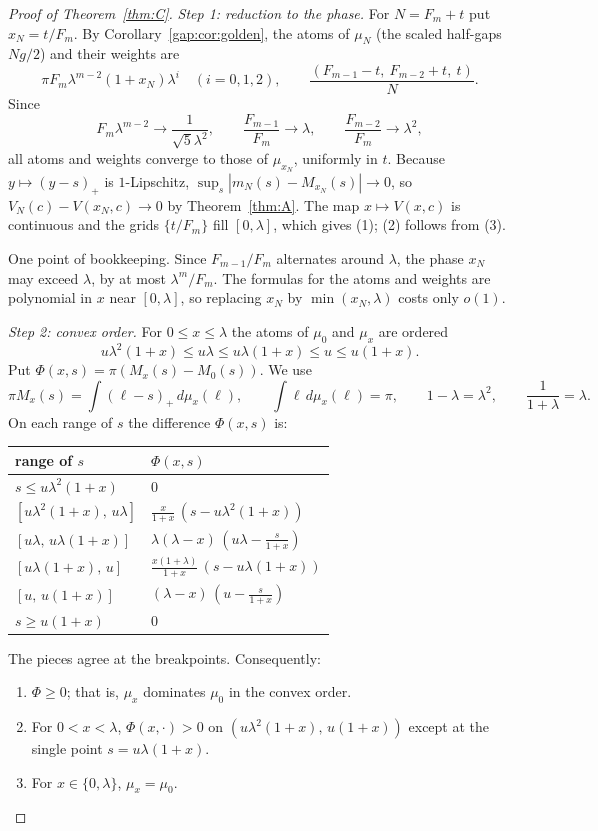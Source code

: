 \documentclass[11pt]{amsart}
\theoremstyle{remark}
\begin{document}
\begin{proof}[Proof of Theorem~\ref{thm:C}]
\emph{Step 1: reduction to the phase.} For $N=F_m+t$ put $x_N=t/F_m$. By
Corollary~\ref{gap:cor:golden}, the atoms of $\mu_N$ (the scaled half-gaps $Ng/2$) and their weights are
\[
\pi F_m\lambda^{m-2}(1+x_N)\lambda^i\quad(i=0,1,2),\qquad
\frac{(F_{m-1}-t,\ F_{m-2}+t,\ t)}{N}.
\]
Since
\[
F_m\lambda^{m-2}\to\frac1{\sqrt5\lambda^2},\qquad
\frac{F_{m-1}}{F_m}\to\lambda,\qquad
\frac{F_{m-2}}{F_m}\to\lambda^2,
\]
all atoms and weights converge to those of $\mu_{x_N}$, uniformly in $t$. Because
$y\mapsto(y-s)_+$ is $1$-Lipschitz, $\sup_s|m_N(s)-M_{x_N}(s)|\to0$, so
$V_N(c)-V(x_N,c)\to0$ by Theorem~\ref{thm:A}. The map $x\mapsto V(x,c)$ is continuous and
the grids $\{t/F_m\}$ fill $[0,\lambda]$, which gives (1); (2) follows from (3).

One point of bookkeeping. Since $F_{m-1}/F_m$ alternates around $\lambda$, the phase $x_N$
may exceed $\lambda$, by at most $\lambda^m/F_m$. The formulas for the atoms and weights
are polynomial in $x$ near $[0,\lambda]$, so replacing $x_N$ by $\min(x_N,\lambda)$ costs
only $o(1)$.

\emph{Step 2: convex order.} For $0\le x\le\lambda$ the atoms of $\mu_0$ and $\mu_x$ are ordered
\[
u\lambda^2(1+x)\le u\lambda\le u\lambda(1+x)\le u\le u(1+x).
\]
Put $\Phi(x,s)=\pi(M_x(s)-M_0(s))$. We use
\[
\pi M_x(s)=\int(\ell-s)_+\,d\mu_x(\ell),\qquad
\int\ell\,d\mu_x(\ell)=\pi,\qquad
1-\lambda=\lambda^2,\qquad
\frac1{1+\lambda}=\lambda .
\]
On each range of $s$ the difference $\Phi(x,s)$ is:
\begin{center}
\begin{tabular}{@{}ll@{}}
\toprule
range of $s$ & $\Phi(x,s)$\\
\midrule
$s\le u\lambda^2(1+x)$ & $0$\\
$[u\lambda^2(1+x),\,u\lambda]$ & $\frac{x}{1+x}\,(s-u\lambda^2(1+x))$\\
$[u\lambda,\,u\lambda(1+x)]$ & $\lambda(\lambda-x)\,(u\lambda-\frac{s}{1+x})$\\
$[u\lambda(1+x),\,u]$ & $\frac{x(1+\lambda)}{1+x}\,(s-u\lambda(1+x))$\\
$[u,\,u(1+x)]$ & $(\lambda-x)\,(u-\frac{s}{1+x})$\\
$s\ge u(1+x)$ & $0$\\
\bottomrule
\end{tabular}
\end{center}
The pieces agree at the breakpoints. Consequently:
\begin{enumerate}
\item[(a)] $\Phi\ge0$; that is, $\mu_x$ dominates $\mu_0$ in the convex order.
\item[(b)] For $0<x<\lambda$, $\Phi(x,\cdot)>0$ on $(u\lambda^2(1+x),\,u(1+x))$ except at the single point $s=u\lambda(1+x)$.
\item[(c)] For $x\in\{0,\lambda\}$, $\mu_x=\mu_0$.
\end{enumerate}


\end{proof}
\end{document}
